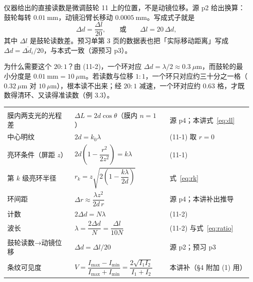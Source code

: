 \documentclass[11pt]{ctexart}
\newcommand{\Dl}{d}
\begin{document}

仪器给出的直接读数是微调鼓轮 11 上的位置，不是动镜位移。源 p2 给出换算：鼓轮每转 $0.01\ \mathrm{mm}$，动镜沿臂长移动 $0.0005\ \mathrm{mm}$。写成式子就是
\begin{equation}
  \Delta\Dl=\frac{\Delta l}{20},\qquad \text{或}\qquad \Delta l=20\,\Delta\Dl ,
  \label{eq:ratio}
\end{equation}
其中 $\Delta l$ 是鼓轮读数差。预习单第 3 页的数据表也把「实际移动距离」写成 $\Delta\Dl=\overline{\Delta\Dl_i}/20$，与本式一致（源预习 p3）。

为什么需要这个 $20:1$？由 (11-2)，一个环对应 $\Delta\Dl=\lambda/2\approx0.3\ \mu\mathrm{m}$，而鼓轮的最小分度是 $0.01\ \mathrm{mm}=10\ \mu\mathrm{m}$。若读数与位移 $1:1$，一个环只对应约三十分之一格（$0.32\ \mu\mathrm{m}$ 对 $10\ \mu\mathrm{m}$），根本读不出来；经 $20:1$ 减速，一个环对应约 $0.63$ 格，才既数得清环、又读得准读数（例 3.3）。


{\small
\begin{longtable}{@{}L{4.1cm}L{8.1cm}L{3.1cm}@{}}
\toprule
{} &  &  \\
\midrule
\endfirsthead
\toprule
{} &  &  \\
\midrule
\endhead
\bottomrule
\endlastfoot
膜内两支光的光程差 & $\Delta L=2\Dl\cos\theta$（膜内 $n=1$） & 源 p4；本讲式~\eqref{eq:dl} \\
中心明纹 & $2\Dl=k_0\lambda$ & (11-1) 取 $r=0$ \\
亮环条件（屏距 $z$） & $2\Dl\left(1-\dfrac{r^2}{2z^2}\right)=k\lambda$ & (11-1) \\
第 $k$ 级亮环半径 & $r_k=z\sqrt{2\left(1-\dfrac{k\lambda}{2\Dl}\right)}$ & 式~\eqref{eq:rk} \\
环间距 & $\Delta r\approx\dfrac{\lambda z^2}{2\Dl\,r}$ & 源 p4；本讲补出推导 \\
计数 & $2\Delta\Dl=N\lambda$ & (11-2) \\
波长 & $\lambda=\dfrac{2\Delta\Dl}{N}=\dfrac{\Delta l}{10N}$ & (11-2) 与式~\eqref{eq:ratio} \\
鼓轮读数→动镜位移 & $\Delta\Dl=\Delta l/20$ & 源 p2；预习 p3 \\
条纹可见度 & $V=\dfrac{I_{\max}-I_{\min}}{I_{\max}+I_{\min}}=\dfrac{2\sqrt{I_1I_2}}{I_1+I_2}$ & 本讲补（§4 附加 (1) 用） \\
\end{longtable}}
\end{document}
